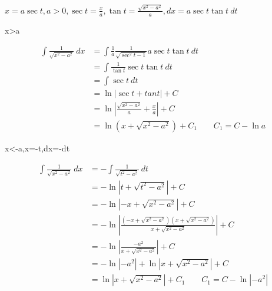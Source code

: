\centerline{$x=a\sec t,a>0,\sec t =\frac{x}{a},\tan t=\frac{\sqrt{x^2-a^2}}{a},dx=a\sec t\tan t\ dt$}
\vspace{-6mm}
\centerline{x>a}
\begin{align*}
        \int \frac{1}{\sqrt{x^2-a^2}}\ dx&=\int\frac{1}{a} \frac{1}{\sqrt{\sec^2t-1}}a\sec t\tan t\ dt\\
        &=\int \frac{1}{\tan t}\sec t\tan t\ dt\\
        &=\int \sec t \ dt\\
        &=\ln\left|\sec t+ tan t\right|+C\\
        &=\ln\left|\frac{\sqrt{x^2-a^2}}{a}+ \frac{x}{a}\right|+C\\
        &=\ln(x+\sqrt{x^2-a^2})+C_1\qquad C_1=C-\ln a
\end{align*}
\centerline{x<-a,x=-t,dx=-dt}
\begin{align*}
        \int \frac{1}{\sqrt{x^2-a^2}} \ dx&=-\int \frac{1}{\sqrt{t^2-a^2}} \ dt\\
        &=-\ln \left|t+\sqrt{t^2-a^2}\right|+C \\
        &=-\ln \left|-x+\sqrt{x^2-a^2}\right|+C\\
        &=-\ln \left|\frac{(-x+\sqrt{x^2-a^2})(x+\sqrt{x^2-a^2})}{x+\sqrt{x^2-a^2}}\right|+C\\
        &=-\ln \left|\frac{-a^2}{x+\sqrt{x^2-a^2}}\right|+C\\
        &=-\ln\left|-a^2\right| +\ln\left|{x+\sqrt{x^2-a^2}}\right|+C\\
        &=\ln\left|{x+\sqrt{x^2-a^2}}\right|+C_1\qquad C_1=C-\ln\left|-a^2\right|
\end{align*}